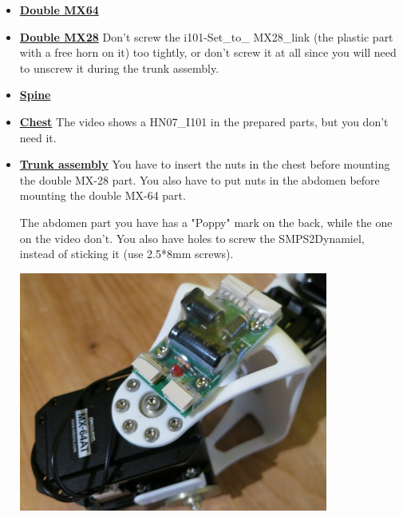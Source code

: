 \documentclass{article}
\begin{document}
 \begin{itemize}
\item \textbf{\href{https://github.com/poppy-project/Robotis-library/blob/master/doc/en/double\_MX64\_assembly.md}{Double MX64}}
\item \textbf{\href{https://github.com/poppy-project/Robotis-library/blob/master/doc/en/double\_MX28\_assembly.md}{Double MX28}} Don't screw the i101-Set\_to\_ MX28\_link (the plastic part with a free horn on it) too tightly, or don't screw it at all since you will need to unscrew it during the trunk assembly.
\item \textbf{\href{https://github.com/poppy-project/Poppy-multiarticulated-torso/blob/master/doc/en/subassembly/spine\_assembly\_instructions.md}{Spine}}
\item \textbf{\href{https://github.com/poppy-project/Poppy-multiarticulated-torso/blob/master/doc/en/subassembly/chest\_assembly\_instructions.md}{Chest}} The video shows a HN07\_I101 in the prepared parts, but you don't need it.
\item \textbf{\href{https://github.com/poppy-project/Poppy-multiarticulated-torso/blob/master/doc/en/5\_DoFs\_humanoid\_spine.md}{Trunk assembly}} You have to insert the nuts in the chest before mounting the double MX-28 part. You also have to put nuts in the abdomen before mounting the double MX-64 part.

The abdomen part you have has a "Poppy" mark on the back, while the one on the video don't. You also have holes to screw the SMPS2Dynamiel, instead of sticking it (use 2.5*8mm screws).
\begin{center}
  \includegraphics[width=0.8\textwidth]{img/screwed_SMPS}
\end{center}
\end{itemize}
\end{document}

